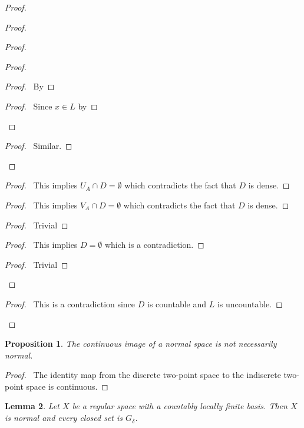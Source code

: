 \documentclass{report}
\let\qed\relax
\newtheorem{lm}{Lemma}[section]
\newtheorem{prop}[lm]{Proposition}
\theoremstyle{definition}
\begin{document}
\begin{proof}
\begin{proof}
\begin{proof}
\begin{proof}
      \begin{proof}
        \pf\ By 
      \end{proof}
      \begin{proof}
        \pf\ Since $x \in L$ by 
      \end{proof}
    \end{proof}
    \begin{proof}
      \pf\ Similar.
    \end{proof}
  \end{proof}
  \begin{proof}
    \pf\ This implies $U_A \cap D = \emptyset$ which contradicts the fact that
    $D$ is dense.
  \end{proof}
  \begin{proof}
    \pf\ This implies $V_A \cap D = \emptyset$ which contradicts the fact that
    $D$ is dense.
  \end{proof}
  \begin{proof}
    \pf\ Trivial
  \end{proof}
  \begin{proof}
    \pf\ This implies $D = \emptyset$ which is a contradiction.
  \end{proof}
  \begin{proof}
    \pf\ Trivial
  \end{proof}
\end{proof}
\qedstep
\begin{proof}
  \pf\ This is a contradiction since $D$ is countable and $L$ is uncountable.
\end{proof}
  \qed
 \end{proof}

 \begin{prop}
   The continuous image of a normal space is not necessarily normal.
 \end{prop}

 \begin{proof}
   \pf\ The identity map from the discrete two-point space to the indiscrete two-point space is continuous. \qed
 \end{proof}

 \begin{lm}
   \label{lm:topology:normal:regular_countably_locally_finite}
   Let $X$ be a regular space with a countably locally finite basis. Then $X$ is normal and every closed set is $G_\delta$.
 \end{lm}
\end{document}
